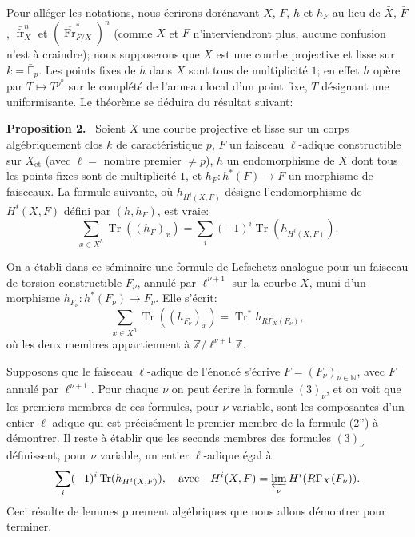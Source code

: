 \documentclass[11pt]{article}
\newenvironment{statement}[1]{\par\medskip\noindent\textbf{#1.}\ }{\par\medskip}
\providecommand{\et}{\mathrm{\acute{e}t}}
\providecommand{\Tr}{\operatorname{Tr}}
\providecommand{\Tr}{\operatorname{Tr}}
\providecommand{\Tr}{\operatorname{Tr}}
\providecommand{\Tr}{\operatorname{Tr}}
\providecommand{\Tr}{\operatorname{Tr}}
\providecommand{\fr}{\operatorname{fr}}
\providecommand{\Fr}{\operatorname{Fr}}
\providecommand{\Fr}{\operatorname{Fr}}
\providecommand{\fr}{\operatorname{fr}}
\providecommand{\et}{\acute{e}t}
\begin{document}
Pour alléger les notations, nous écrirons dorénavant $X$, $F$, $h$ et $h_F$ au lieu de $\bar X$, $\bar F$, $\bar{\fr}_X^n$ et $(\overline{\Fr}^*_{F/X})^n$ (comme $X$ et $F$ n'interviendront plus, aucune confusion n'est à craindre); nous supposerons que $X$ est une courbe projective et lisse sur $k=\bar{\mathbb F}_p$. Les points fixes de $h$ dans $X$ sont tous de multiplicité $1$; en effet $h$ opère par $T\mapsto T^{p^n}$ sur le complété de l'anneau local d'un point fixe, $T$ désignant une uniformisante. Le théorème se déduira du résultat suivant:

\begin{statement}{Proposition 2}
Soient $X$ une courbe projective et lisse sur un corps algébriquement clos $k$ de caractéristique $p$, $F$ un faisceau $\ell$-adique constructible sur $X_{\et}$ (avec $\ell=$ nombre premier $\ne p$), $h$ un endomorphisme de $X$ dont tous les points fixes sont de multiplicité $1$, et $h_F:h^*(F)\to F$ un morphisme de faisceaux. La formule suivante, où $h_{H^i(X,F)}$ désigne l'endomorphisme de $H^i(X,F)$ défini par $(h,h_F)$, est vraie:
\[
\sum_{x\in X^h}\Tr((h_F)_x)=\sum_i(-1)^i\Tr(h_{H^i(X,F)}).
\tag{2''}
\]
\end{statement}

On a établi dans ce séminaire une formule de Lefschetz analogue pour un faisceau de torsion constructible $F_\nu$, annulé par $\ell^{\nu+1}$ sur la courbe $X$, muni d'un morphisme $h_{F_\nu}:h^*(F_\nu)\to F_\nu$. Elle s'écrit:
\[
\sum_{x\in X^h}\Tr((h_{F_\nu})_x)=\Tr^*h_{R\Gamma_X(F_\nu)},
\tag{3}
\]
où les deux membres appartiennent à $\mathbb Z/\ell^{\nu+1}\mathbb Z$.

Supposons que le faisceau $\ell$-adique de l'énoncé s'écrive $F=(F_\nu)_{\nu\in\mathbb N}$, avec $F$ annulé par $\ell^{\nu+1}$. Pour chaque $\nu$ on peut écrire la formule $(3)_\nu$, et on voit que les premiers membres de ces formules, pour $\nu$ variable, sont les composantes d'un entier $\ell$-adique qui est précisément le premier membre de la formule (2'') à démontrer. Il reste à établir que les seconds membres des formules $(3)_\nu$ définissent, pour $\nu$ variable, un entier $\ell$-adique égal à
\[
\sum_i(-1)^i\Tr(h_{H^i(X,F)}),
\quad\text{avec}\quad
H^i(X,F)=\varprojlim_\nu H^i(R\Gamma_X(F_\nu)).
\]
Ceci résulte de lemmes purement algébriques que nous allons démontrer pour terminer.
\end{document}
